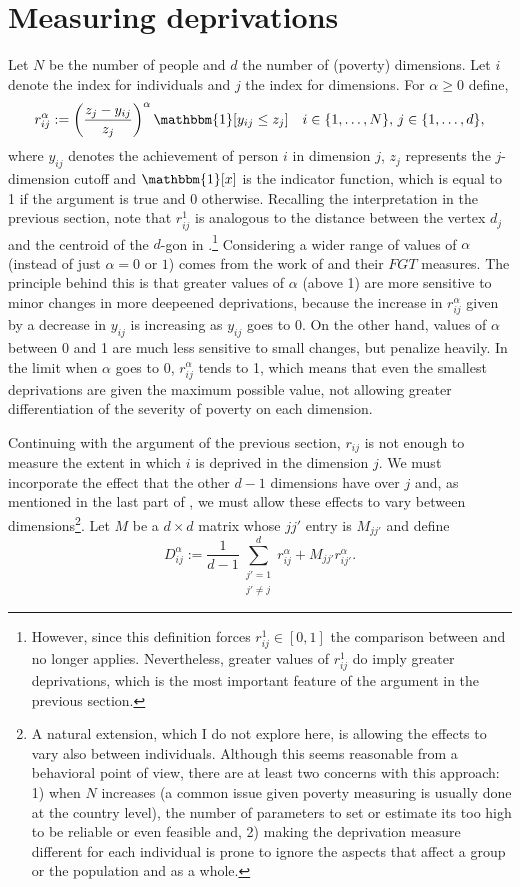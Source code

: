 \documentclass[english, a4paper,12pt]{article}
\begin{document}
\section{Measuring deprivations} \label{sec:measuring}
Let $N$ be the number of people and $d$ the number of (poverty) dimensions. Let $i$ denote the index for individuals and $j$ the index for dimensions. For $\alpha \geq 0$ define,
	$$r_{ij}^{\alpha}:= \left(\frac{z_{j} - y_{ij}}{z_{j}}\right)^{\alpha} \mathbbm{1}[y_{ij} \leq z_{j}] \quad i \in \{1,\ldots,N\},\, j \in \{1,\ldots,d\},$$
where $y_{ij}$ denotes the achievement of person $i$ in dimension $j$, $z_{j}$ represents the $j$-dimension cutoff and $\mathbbm{1}[x]$ is the indicator function, which is equal to 1 if the argument is true and 0 otherwise. Recalling the interpretation in the previous section, note that $r_{ij}^{1}$ is analogous to the distance between the vertex $d_{j}$ and the centroid of the $d$-gon in .\footnote{However, since this definition forces $r_{ij}^{1} \in [0,1]$ the comparison between  and  no longer applies. Nevertheless, greater values of $r_{ij}^{1}$ do imply greater deprivations, which is the most important feature of the argument in the previous section.} 
Considering a wider range of values of $\alpha$ (instead of just $\alpha = 0$ or $1$) comes from the work of \cite{FGTpaper} and their $FGT$ measures. The principle behind this is that greater values of $\alpha$ (above 1) are more sensitive to minor changes in more deepeened deprivations, because the increase in $r_{ij}^{\alpha}$ given by a decrease in $y_{ij}$ is increasing as $y_{ij}$ goes to 0. On the other hand, values of $\alpha$ between 0 and 1 are much less sensitive to small changes, but penalize heavily. In the limit when $\alpha$ goes to 0, $r_{ij}^{\alpha}$ tends to 1, which means that even the smallest deprivations are given the maximum possible value, not allowing greater differentiation of the severity of poverty on each dimension.

Continuing with the argument of the previous section, $r_{ij}$ is not enough to measure the extent in which $i$ is deprived in the dimension $j$. We must incorporate the effect that the other $d-1$ dimensions have over $j$ and, as mentioned in the last part of , we must allow these effects to vary between dimensions\footnote{A natural extension, which I do not explore here, is allowing the effects to vary also between individuals. Although this seems reasonable from a behavioral point of view, there are at least two concerns with this approach: 1) when $N$ increases (a common issue given poverty measuring is usually done at the country level), the number of parameters to set or estimate its too high to be reliable or even feasible and, 2) making the deprivation measure different for each individual is prone to ignore the aspects that affect a group or the population and as a whole.}. Let $M$ be a $d\times d$ matrix whose $jj'$ entry is $M_{jj'}$ and define
	\begin{equation}
		D_{ij}^{\alpha}
			:=	\frac{1}{d-1} \sum_{\substack{j'=1 \\ j' \neq j}}^{d} r_{ij}^{\alpha} + M_{jj'}r_{ij'}^{\alpha} \label{eq:Dalpha}.
	\end{equation}
\end{document}

